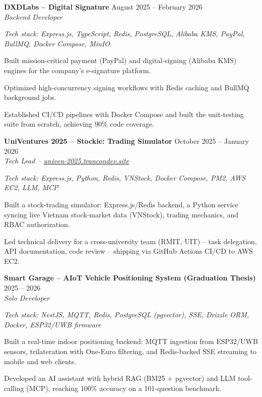 \documentclass[10pt,a4paper]{article}
\renewcommand{\section}[1]{%
  \par\vspace{3.5pt}%
  \noindent{\large\bfseries\color{accentcolor}#1}\par
  \nointerlineskip\vspace{-1pt}%
  \noindent{\color{accentcolor}\rule{\linewidth}{0.8pt}}\par
  \nointerlineskip\vspace{2.5pt}%
}
\renewenvironment{itemize}
  {\begin{list}{{\color{accentcolor}\small\raisebox{0.1em}{$\bullet$}}}%
     {\setlength{\leftmargin}{1.1em}%
      \setlength{\itemindent}{0pt}%
      \setlength{\itemsep}{0.5pt}%
      \setlength{\parsep}{0pt}%
      \setlength{\topsep}{1pt}%
      \setlength{\listparindent}{0pt}}%
      \RaggedRight}
  {\end{list}}
\newcommand{\jobheader}[3]{
  \textbf{#1} \hfill #2 \\
  \textit{#3}
}
\newcommand{\techstack}[1]{
  \par{\small\color{stackgray}\textit{Tech stack: #1}}
}
\begin{document}
\jobheader{DXDLabs -- Digital Signature}{August 2025 -- February 2026}{Backend Developer}
\techstack{Express.js, TypeScript, Redis, PostgreSQL, Alibaba KMS, PayPal, BullMQ, Docker Compose, MinIO}
\begin{itemize}
  \item Built mission-critical payment (PayPal) and digital-signing (Alibaba KMS) engines for the company's e-signature platform.
  \item Optimized high-concurrency signing workflows with Redis caching and BullMQ background jobs.
  \item Established CI/CD pipelines with Docker Compose and built the unit-testing suite from scratch, achieving 90\% code coverage.
\end{itemize}

\section{Projects}

\jobheader{UniVentures 2025 -- Stockie: Trading Simulator}{October 2025 -- January 2026}{Tech Lead \textnormal{--} \href{https://univen-2025.trancondev.site}{univen-2025.trancondev.site}}
\techstack{Express.js, Python, Redis, VNStock, Docker Compose, PM2, AWS EC2, LLM, MCP}
\begin{itemize}
  \item Built a stock-trading simulator: Express.js/Redis backend, a Python service syncing live Vietnam stock-market data (VNStock), trading mechanics, and RBAC authorization.
  \item Led technical delivery for a cross-university team (RMIT, UIT) -- task delegation, API documentation, code review -- shipping via GitHub Actions CI/CD to AWS EC2.
\end{itemize}

\jobheader{Smart Garage -- AIoT Vehicle Positioning System (Graduation Thesis)}{2025 -- 2026}{Solo Developer}
\techstack{NestJS, MQTT, Redis, PostgreSQL (pgvector), SSE, Drizzle ORM, Docker, ESP32/UWB firmware}
\begin{itemize}
  \item Built a real-time indoor positioning backend: MQTT ingestion from ESP32/UWB sensors, trilateration with One-Euro filtering, and Redis-backed SSE streaming to mobile and web clients.
  \item Developed an AI assistant with hybrid RAG (BM25 + pgvector) and LLM tool-calling (MCP), reaching 100\% accuracy on a 101-question benchmark.
\end{itemize}
\end{document}

